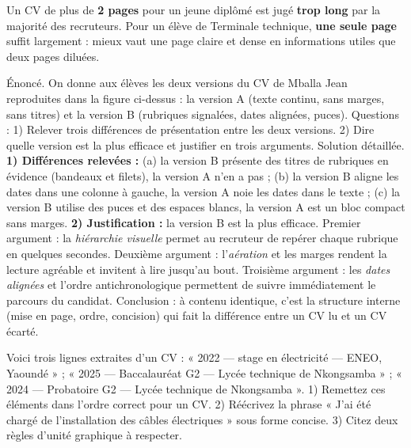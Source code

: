 \documentclass[11pt]{article}
\newcounter{popsec}
\newcounter{popsub}
\newcommand{\courssub}[1]{%
  \stepcounter{popsub}%
  \par\vspace{9pt}\noindent{\popxbold\fontsize{11.5}{13}\selectfont\color{popink}{\color{poporange}\thepopsec.\thepopsub}\hspace{6pt}#1}\par\nopagebreak\vspace{4pt}
}
\begin{document}
\begin{exemplebox}
Un CV de plus de \textbf{2 pages} pour un jeune diplômé est jugé \textbf{trop long} par la majorité des recruteurs. Pour un élève de Terminale technique, \textbf{une seule page} suffit largement : mieux vaut une page claire et dense en informations utiles que deux pages diluées.
\end{exemplebox}

\courssub{Activité : comparer deux mises en page}

\begin{exoresolu}
Énoncé. On donne aux élèves les deux versions du CV de Mballa Jean reproduites dans la figure ci-dessus : la version A (texte continu, sans marges, sans titres) et la version B (rubriques signalées, dates alignées, puces). Questions : 1) Relever trois différences de présentation entre les deux versions. 2) Dire quelle version est la plus efficace et justifier en trois arguments.
\tcblower
Solution détaillée.
\textbf{1) Différences relevées :} (a) la version B présente des titres de rubriques en évidence (bandeaux et filets), la version A n'en a pas ; (b) la version B aligne les dates dans une colonne à gauche, la version A noie les dates dans le texte ; (c) la version B utilise des puces et des espaces blancs, la version A est un bloc compact sans marges.
\textbf{2) Justification :} la version B est la plus efficace. Premier argument : la \emph{hiérarchie visuelle} permet au recruteur de repérer chaque rubrique en quelques secondes. Deuxième argument : l'\emph{aération} et les marges rendent la lecture agréable et invitent à lire jusqu'au bout. Troisième argument : les \emph{dates alignées} et l'ordre antichronologique permettent de suivre immédiatement le parcours du candidat. Conclusion : à contenu identique, c'est la structure interne (mise en page, ordre, concision) qui fait la différence entre un CV lu et un CV écarté.
\end{exoresolu}

\begin{exercice}
Voici trois lignes extraites d'un CV : « 2022 — stage en électricité — ENEO, Yaoundé » ; « 2025 — Baccalauréat G2 — Lycée technique de Nkongsamba » ; « 2024 — Probatoire G2 — Lycée technique de Nkongsamba ». 1) Remettez ces éléments dans l'ordre correct pour un CV. 2) Réécrivez la phrase « J'ai été chargé de l'installation des câbles électriques » sous forme concise. 3) Citez deux règles d'unité graphique à respecter.
\end{exercice}
\end{document}
